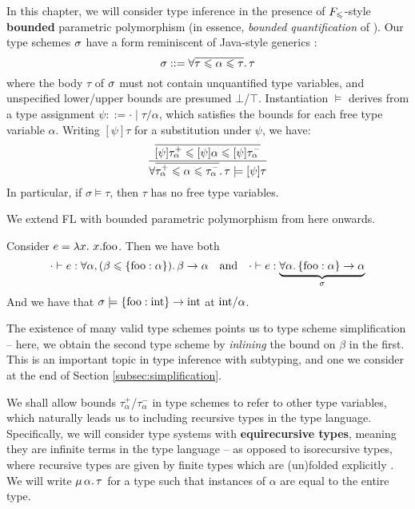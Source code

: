 In this chapter, we will consider type inference in the presence of $F_\leqslant$-style \textbf{bounded} parametric polymorphism (in essence, \emph{bounded quantification} of \textcite{bounded-quantification}). Our type schemes $\sigma$ have a form reminiscent of Java-style generics \cite{generic-java, simple-sub}:
$$ \sigma ::= \forall \overline{\tau \leqslant \alpha \leqslant \tau} \ldotp \tau $$
where the body $\tau$ of $\sigma$ must not contain unquantified type variables, and unspecified lower/upper bounds are presumed $\bot$/$\top$. 
Instantiation $\models$ derives from a type assignment $\psi ::= \cdot \mid \tau/\alpha$, which satisfies the bounds for each free type variable $\alpha$. Writing $[\psi]\tau$ for a substitution under $\psi$, we have:
$$ \dfrac{\overline{[\psi]\tau_\alpha^+ \sub \substx{\psi} \alpha \sub [\psi]\tau_\alpha^-}}{\forall \overline{\tau_\alpha^+ \sub \alpha \sub \tau_\alpha^-} \ldotp \tau \models \substx{\psi}{\tau}} $$
In particular, if $\sigma \models \tau$, then $\tau$ has no free type variables.

\begin{example}
    We extend FL with bounded parametric polymorphism from here onwards. 

    Consider $e = \lambda {x} \ldotp\, {x}{.}{\mathrm{foo}}$. Then we have both 
    $$ \cdot \vdash e : \forall \alpha, (\beta \sub \flrec{\mathrm{foo} : \alpha}) \ldotp \beta \to \alpha  \quad \text{and} \quad \cdot \vdash e : \underbrace{\forall  \alpha \ldotp \flrec{\mathrm{foo} : \alpha} \to \alpha}_\sigma $$
    And we have that $\sigma \models \flrec{\mathrm{foo} : \sint} \to \sint$ at $\mathrm{int}/\alpha$.
    
    The existence of many valid type schemes points us to type scheme simplification -- here, we obtain the second type scheme by \emph{inlining} the bound on $\beta$ in the first. This is an important topic in type inference with subtyping, and one we consider at the end of Section \ref{subsec:simplification}.
\end{example}

We shall allow bounds $\tau_\alpha^+$/$\tau_\alpha^-$ in type schemes to refer to other type variables, which naturally leads us to including recursive types in the type language.
Specifically, we will consider type systems with \textbf{equirecursive types}, meaning they are infinite terms in the type language -- as opposed to isorecursive types, where recursive types are given by finite types which are (un)folded explicitly \cite{tapl}. We will write $\mu\,{\alpha}\ldotp \tau$ for a type  such that instances of $\alpha$ are equal to the entire type.

